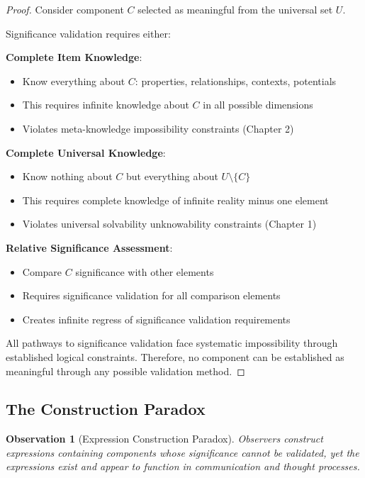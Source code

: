 \documentclass[12pt,a4paper]{article}
\newtheorem{observation}[theorem]{Observation}
\begin{document}
\begin{proof}
Consider component $C$ selected as meaningful from the universal set $U$.

Significance validation requires either:

\textbf{Complete Item Knowledge}:
\begin{itemize}
\item Know everything about $C$: properties, relationships, contexts, potentials
\item This requires infinite knowledge about $C$ in all possible dimensions
\item Violates meta-knowledge impossibility constraints (Chapter 2)
\end{itemize}

\textbf{Complete Universal Knowledge}:
\begin{itemize}
\item Know nothing about $C$ but everything about $U \setminus \{C\}$
\item This requires complete knowledge of infinite reality minus one element
\item Violates universal solvability unknowability constraints (Chapter 1)
\end{itemize}

\textbf{Relative Significance Assessment}:
\begin{itemize}
\item Compare $C$ significance with other elements
\item Requires significance validation for all comparison elements
\item Creates infinite regress of significance validation requirements
\end{itemize}

All pathways to significance validation face systematic impossibility through established logical constraints. Therefore, no component can be established as meaningful through any possible validation method.
\end{proof}

\subsection{The Construction Paradox}

\begin{observation}[Expression Construction Paradox]
Observers construct expressions containing components whose significance cannot be validated, yet the expressions exist and appear to function in communication and thought processes.
\end{observation}
\end{document}
